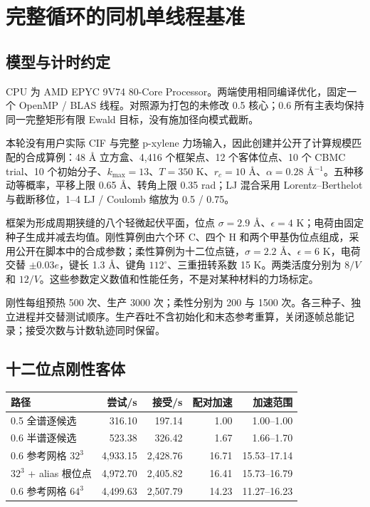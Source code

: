 \section{完整循环的同机单线程基准}

\subsection{模型与计时约定}

CPU 为 AMD EPYC 9V74 80-Core Processor。两端使用相同编译优化，固定一个 OpenMP / BLAS 线程。对照源为打包的未修改 0.5 核心；0.6 所有主表均保持同一完整矩形有限 Ewald 目标，没有施加径向模式截断。

本轮没有用户实际 CIF 与完整 p-xylene 力场输入，因此创建并公开了计算规模匹配的合成算例：48 \AA{} 立方盒、4,416 个框架点、12 个客体位点、10 个 CBMC trial、10 个初始分子、$k_{\max}=13$、$T=350$ K、$r_c=10$ \AA{}、$\alpha=0.28$ \AA$^{-1}$。五种移动等概率，平移上限 0.65 \AA{}、转角上限 0.35 rad；LJ 混合采用 Lorentz--Berthelot 与截断移位，1--4 LJ / Coulomb 缩放为 0.5 / 0.75。

框架为形成周期狭缝的八个轻微起伏平面，位点 $\sigma=2.9$ \AA、$\epsilon=4$ K；电荷由固定种子生成并减去均值。刚性算例由六个环 C、四个 H 和两个甲基伪位点组成，采用公开在脚本中的合成参数；柔性算例为十二位点链，$\sigma=2.2$ \AA、$\epsilon=6$ K，电荷交替 $\pm0.03e$，键长 1.3 \AA、键角 $112^\circ$、三重扭转系数 15 K。两类活度分别为 $8/V$ 和 $12/V$。这些参数定义数值和性能任务，不是对某种材料的力场标定。

刚性每组预热 500 次、生产 3000 次；柔性分别为 200 与 1500 次。各三种子、独立进程并交替测试顺序。生产吞吐不含初始化和末态参考重算，关闭逐帧总能记录；接受次数与计数轨迹同时保留。

\subsection{十二位点刚性客体}

\begin{center}\small
\begin{tabular}{@{}lrrrr@{}}\toprule
路径 & 尝试/s & 接受/s & 配对加速 & 加速范围\\\midrule
0.5 全谱逐候选 & 316.10 & 197.14 & 1.00 & 1.00--1.00\\
0.6 半谱逐候选 & 523.38 & 326.42 & 1.67 & 1.66--1.70\\
0.6 参考网格 $32^3$ & 4,933.15 & 2,428.76 & 16.71 & 15.53--17.14\\
$32^3$ + alias 根位点 & 4,972.70 & 2,405.82 & 16.41 & 15.73--16.79\\
0.6 参考网格 $64^3$ & 4,499.63 & 2,507.79 & 14.23 & 11.27--16.23\\
\bottomrule\end{tabular}\end{center}

